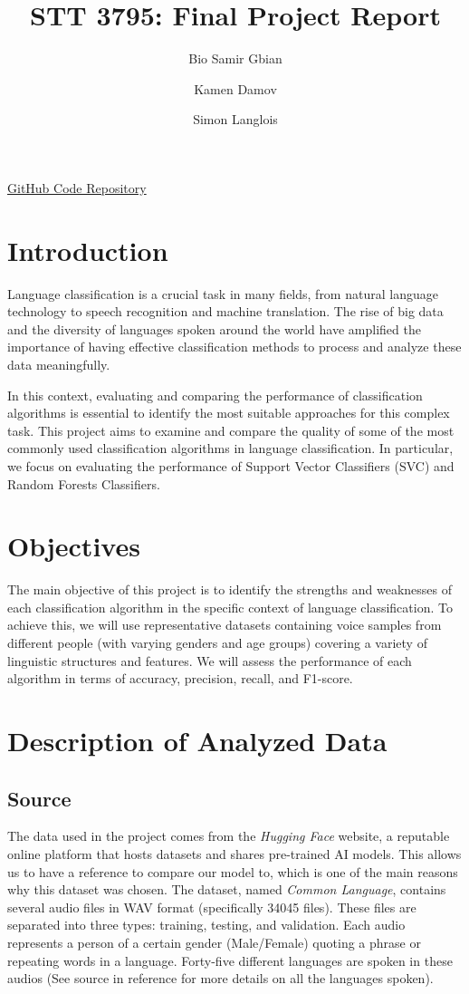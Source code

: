\documentclass[twocolumn]{article}
\title{STT 3795: Final Project Report}
\author[1]{Bio Samir Gbian}
\author[1]{Kamen Damov}
\author[1]{Simon Langlois}
\affil{Department of Mathematics and Statistics}
\affil[1]{University of Montreal}
\begin{document}
\maketitle

\href{https://github.com/Gonxped31/Projet-STT-3795}{GitHub Code Repository}

\section{Introduction}
\label{1}
Language classification is a crucial task in many fields, from natural language technology to speech recognition and machine translation. The rise of big data and the diversity of languages spoken around the world have amplified the importance of having effective classification methods to process and analyze these data meaningfully.

In this context, evaluating and comparing the performance of classification algorithms is essential to identify the most suitable approaches for this complex task. This project aims to examine and compare the quality of some of the most commonly used classification algorithms in language classification. In particular, we focus on evaluating the performance of Support Vector Classifiers (SVC) and Random Forests Classifiers.


\section{Objectives}
\label{2}
The main objective of this project is to identify the strengths and weaknesses of each classification algorithm in the specific context of language classification. To achieve this, we will use representative datasets containing voice samples from different people (with varying genders and age groups) covering a variety of linguistic structures and features. We will assess the performance of each algorithm in terms of accuracy, precision, recall, and F1-score.


\section{Description of Analyzed Data}
\label{3}
\subsection{Source}
\label{3.1}
The data used in the project comes from the \textit{Hugging Face} website, a reputable online platform that hosts datasets and shares pre-trained AI models. This allows us to have a reference to compare our model to, which is one of the main reasons why this dataset was chosen.
The dataset, named \textit{Common Language}, contains several audio files in WAV format (specifically 34045 files). These files are separated into three types: training, testing, and validation. Each audio represents a person of a certain gender (Male/Female) quoting a phrase or repeating words in a language. Forty-five different languages are spoken in these audios (See source in reference for more details on all the languages spoken).
\end{document}
